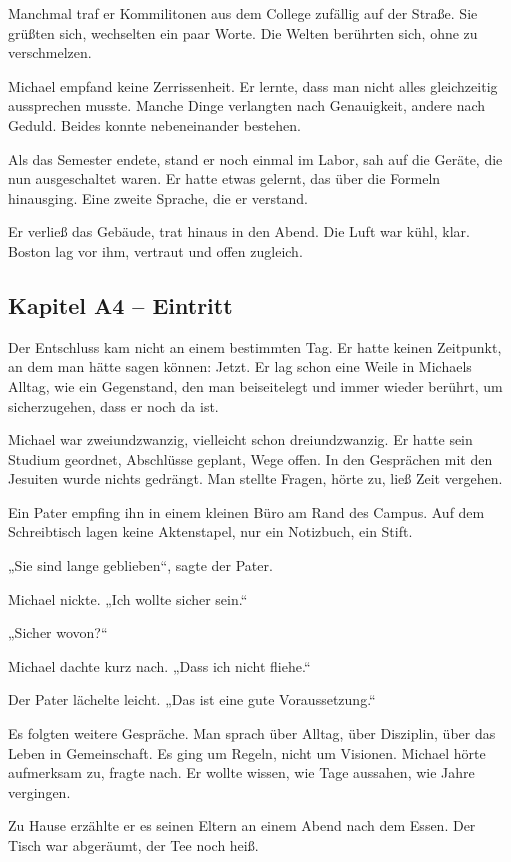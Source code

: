 \documentclass[
]{article}
\begin{document}
Manchmal traf er Kommilitonen aus dem College zufällig auf der Straße. Sie grüßten sich, wechselten ein paar Worte. Die Welten berührten sich, ohne zu verschmelzen.

Michael empfand keine Zerrissenheit. Er lernte, dass man nicht alles gleichzeitig aussprechen musste. Manche Dinge verlangten nach Genauigkeit, andere nach Geduld. Beides konnte nebeneinander bestehen.

Als das Semester endete, stand er noch einmal im Labor, sah auf die Geräte, die nun ausgeschaltet waren. Er hatte etwas gelernt, das über die Formeln hinausging. Eine zweite Sprache, die er verstand.

Er verließ das Gebäude, trat hinaus in den Abend. Die Luft war kühl, klar. Boston lag vor ihm, vertraut und offen zugleich.

\subsection{Kapitel A4 -- Eintritt}\label{kapitel-a4-eintritt}

Der Entschluss kam nicht an einem bestimmten Tag. Er hatte keinen Zeitpunkt, an dem man hätte sagen können: Jetzt. Er lag schon eine Weile in Michaels Alltag, wie ein Gegenstand, den man beiseitelegt und immer wieder berührt, um sicherzugehen, dass er noch da ist.

Michael war zweiundzwanzig, vielleicht schon dreiundzwanzig. Er hatte sein Studium geordnet, Abschlüsse geplant, Wege offen. In den Gesprächen mit den Jesuiten wurde nichts gedrängt. Man stellte Fragen, hörte zu, ließ Zeit vergehen.

Ein Pater empfing ihn in einem kleinen Büro am Rand des Campus. Auf dem Schreibtisch lagen keine Aktenstapel, nur ein Notizbuch, ein Stift.

„Sie sind lange geblieben``, sagte der Pater.

Michael nickte. „Ich wollte sicher sein.``

„Sicher wovon?{\kern0pt}``

Michael dachte kurz nach. „Dass ich nicht fliehe.``

Der Pater lächelte leicht. „Das ist eine gute Voraussetzung.``

Es folgten weitere Gespräche. Man sprach über Alltag, über Disziplin, über das Leben in Gemeinschaft. Es ging um Regeln, nicht um Visionen. Michael hörte aufmerksam zu, fragte nach. Er wollte wissen, wie Tage aussahen, wie Jahre vergingen.

Zu Hause erzählte er es seinen Eltern an einem Abend nach dem Essen. Der Tisch war abgeräumt, der Tee noch heiß.
\end{document}
